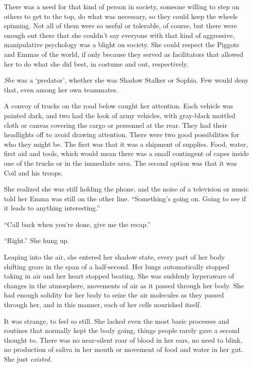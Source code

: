 There was a need for that kind of person in society, someone willing to step on others to get to the top, do what was necessary, so they could keep the wheels spinning.  Not all of them were so useful or tolerable, of course, but there were enough out there that she couldn't say everyone with that kind of aggressive, manipulative psychology was a blight on society.  She could respect the Piggots and Emmas of the world, if only because they served as facilitators that allowed her to do what she did best, in costume and out, respectively.



\emph{S}\emph{he} was a `predator', whether she was Shadow Stalker or Sophia.  Few would deny that, even among her own teammates.



A convoy of trucks on the road below caught her attention.  Each vehicle was painted dark, and two had the look of army vehicles, with gray-black mottled cloth or canvas covering the cargo or personnel at the rear.  They had their headlights off to avoid drawing attention.  There were two good possibilities for who they might be.  The first was that it was a shipment of supplies.  Food, water, first aid and tools, which would mean there was a small contingent of capes inside one of the trucks or in the immediate area.  The second option was that it was Coil and his troops.



She realized she was still holding the phone, and the noise of a television or music told her Emma was still on the other line.  ``Something's going on.  Going to see if it leads to anything interesting.''



``Call back when you're done, give me the recap.''



``Right.''  She hung up.



Leaping into the air, she entered her shadow state, every part of her body shifting gears in the span of a half-second.  Her lungs automatically stopped taking in air and her heart stopped beating.  She was suddenly hyperaware of changes in the atmosphere, movements of air as it passed through her body.  She had enough solidity for her body to seize the air molecules as they passed through her, and in this manner, each of her cells nourished itself.



It was strange, to feel so still.  She lacked even the most basic processes and routines that normally kept the body going, things people rarely gave a second thought to.  There was no near-silent roar of blood in her ears, no need to blink, no production of saliva in her mouth or movement of food and water in her gut.  She just \emph{existed}.



